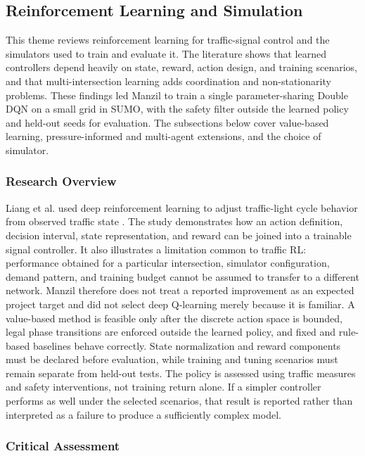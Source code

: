 \subsection{Reinforcement Learning and Simulation}

This theme reviews reinforcement learning for traffic-signal control and the simulators used to train and evaluate it. The literature shows that learned controllers depend heavily on state, reward, action design, and training scenarios, and that multi-intersection learning adds coordination and non-stationarity problems. These findings led Manzil to train a single parameter-sharing Double DQN on a small grid in SUMO, with the safety filter outside the learned policy and held-out seeds for evaluation. The subsections below cover value-based learning, pressure-informed and multi-agent extensions, and the choice of simulator.

\subsubsection{Research Overview}

Liang et al. used deep reinforcement learning to adjust traffic-light cycle behavior from observed traffic state \cite{liang2019dqn}. The study demonstrates how an action definition, decision interval, state representation, and reward can be joined into a trainable signal controller. It also illustrates a limitation common to traffic RL: performance obtained for a particular intersection, simulator configuration, demand pattern, and training budget cannot be assumed to transfer to a different network. Manzil therefore does not treat a reported improvement as an expected project target and did not select deep Q-learning merely because it is familiar. A value-based method is feasible only after the discrete action space is bounded, legal phase transitions are enforced outside the learned policy, and fixed and rule-based baselines behave correctly. State normalization and reward components must be declared before evaluation, while training and tuning scenarios must remain separate from held-out tests. The policy is assessed using traffic measures and safety interventions, not training return alone. If a simpler controller performs as well under the selected scenarios, that result is reported rather than interpreted as a failure to produce a sufficiently complex model.

\subsubsection{Critical Assessment}

